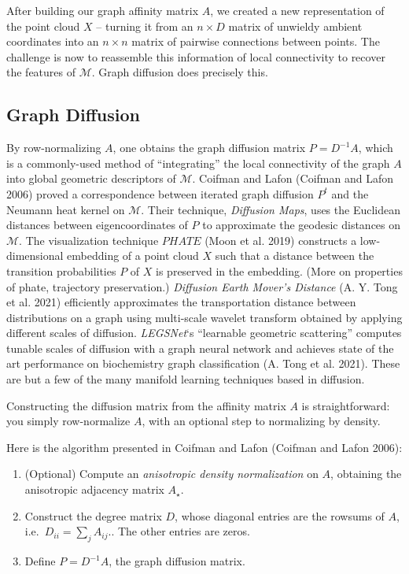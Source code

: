 \documentclass[
  letterpaper,
  DIV=11,
  numbers=noendperiod]{scrartcl}
\providecommand{\tightlist}{%
  \setlength{\itemsep}{0pt}\setlength{\parskip}{0pt}}\usepackage{longtable,booktabs,array}
\theoremstyle{plain}
\theoremstyle{plain}
\theoremstyle{definition}
\theoremstyle{plain}
\theoremstyle{definition}
\theoremstyle{remark}
\begin{document}
After building our graph affinity matrix \(A\), we created a new
representation of the point cloud \(X\) -- turning it from an
\(n \times D\) matrix of unwieldy ambient coordinates into an
\(n \times n\) matrix of pairwise connections between points. The
challenge is now to reassemble this information of local connectivity to
recover the features of \(\mathcal{M}\). Graph diffusion does precisely
this.

\subsection{Graph Diffusion}\label{graph-diffusion}

By row-normalizing \(A\), one obtains the graph diffusion matrix
\(P = D^{-1}A\), which is a commonly-used method of ``integrating'' the
local connectivity of the graph \(A\) into global geometric descriptors
of \(\mathcal{M}\). Coifman and Lafon (Coifman and Lafon 2006) proved a
correspondence between iterated graph diffusion \(P^t\) and the Neumann
heat kernel on \(\mathcal{M}\). Their technique, \emph{Diffusion Maps},
uses the Euclidean distances between eigencoordinates of \(P\) to
approximate the geodesic distances on \(\mathcal{M}\). The visualization
technique \(PHATE\) (Moon et al. 2019) constructs a low-dimensional
embedding of a point cloud \(X\) such that a distance between the
transition probabilities \(P\) of \(X\) is preserved in the embedding.
(More on properties of phate, trajectory preservation.) \emph{Diffusion
Earth Mover's Distance} (A. Y. Tong et al. 2021) efficiently
approximates the transportation distance between distributions on a
graph using multi-scale wavelet transform obtained by applying different
scales of diffusion. \emph{LEGSNet}`s ``learnable geometric scattering''
computes tunable scales of diffusion with a graph neural network and
achieves state of the art performance on biochemistry graph
classification (A. Tong et al. 2021). These are but a few of the many
manifold learning techniques based in diffusion.

Constructing the diffusion matrix from the affinity matrix \(A\) is
straightforward: you simply row-normalize \(A\), with an optional step
to normalizing by density.

Here is the algorithm presented in Coifman and Lafon (Coifman and Lafon
2006):

\begin{enumerate}
\def\labelenumi{\arabic{enumi}.}
\tightlist
\item
  (Optional) Compute an \emph{anisotropic density normalization} on
  \(A\), obtaining the anisotropic adjacency matrix \(A_{\star}\).
\item
  Construct the degree matrix \(D\), whose diagonal entries are the
  rowsums of \(A\), i.e.~\(D_{ii} = \sum_{j}A_{ij}\).. The other entries
  are zeros.
\item
  Define \(P = D^{-1} A\), the graph diffusion matrix.
\end{enumerate}
\end{document}
